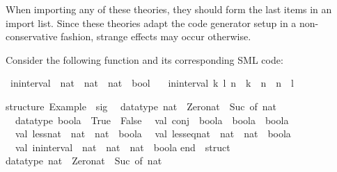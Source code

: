 \begin{isabellebody}
\begin{isamarkuptext}
  \begin{warn}
    When importing any of these theories, they should form the last
    items in an import list.  Since these theories adapt the code
    generator setup in a non-conservative fashion, strange effects may
    occur otherwise.
  \end{warn}%
\end{isamarkuptext}%
\isamarkuptrue%
%
\isamarkuptrue%
%
\begin{isamarkuptext}%
Consider the following function and its corresponding SML code:%
\end{isamarkuptext}%
\isamarkuptrue%
%
\isadelimquote
%
\endisadelimquote
%
\isatagquote
{}\isamarkupfalse%
\ in{\isacharunderscore}interval\ {\isacharcolon}{\isacharcolon}\ {\isachardoublequoteopen}nat\ {\isasymtimes}\ nat\ {\isasymRightarrow}\ nat\ {\isasymRightarrow}\ bool{\isachardoublequoteclose}\ \isanewline
\ \ {\isachardoublequoteopen}in{\isacharunderscore}interval\ {\isacharparenleft}k{\isacharcomma}\ l{\isacharparenright}\ n\ {\isasymlongleftrightarrow}\ k\ {\isasymle}\ n\ {\isasymand}\ n\ {\isasymle}\ l{\isachardoublequoteclose}%
\endisatagquote
{\isafoldquote}%
%
\isadelimquote
%
\endisadelimquote
%
\isadeliminvisible
%
\endisadeliminvisible
%
\isataginvisible
%
\endisataginvisible
{\isafoldinvisible}%
%
\isadeliminvisible
%
\endisadeliminvisible
%
\isadelimquote
%
\endisadelimquote
%
\isatagquote
%
\begin{isamarkuptext}%
\begin{typewriter}
    structure\ Example\ {\isacharcolon}\ sig\isanewline
\ \ datatype\ nat\ {\isacharequal}\ Zero{\isacharunderscore}nat\ {\isacharbar}\ Suc\ of\ nat\isanewline
\ \ datatype\ boola\ {\isacharequal}\ True\ {\isacharbar}\ False\isanewline
\ \ val\ conj\ {\isacharcolon}\ boola\ {\isacharminus}{\isachargreater}\ boola\ {\isacharminus}{\isachargreater}\ boola\isanewline
\ \ val\ less{\isacharunderscore}nat\ {\isacharcolon}\ nat\ {\isacharminus}{\isachargreater}\ nat\ {\isacharminus}{\isachargreater}\ boola\isanewline
\ \ val\ less{\isacharunderscore}eq{\isacharunderscore}nat\ {\isacharcolon}\ nat\ {\isacharminus}{\isachargreater}\ nat\ {\isacharminus}{\isachargreater}\ boola\isanewline
\ \ val\ in{\isacharunderscore}interval\ {\isacharcolon}\ nat\ {\isacharasterisk}\ nat\ {\isacharminus}{\isachargreater}\ nat\ {\isacharminus}{\isachargreater}\ boola\isanewline
end\ {\isacharequal}\ struct\isanewline
\isanewline
datatype\ nat\ {\isacharequal}\ Zero{\isacharunderscore}nat\ {\isacharbar}\ Suc\ of\ nat{\isacharsemicolon}\isanewline

\end{typewriter}
\end{isamarkuptext}
\end{isabellebody}
